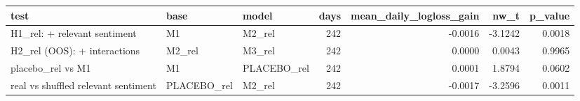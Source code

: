 \begin{tabular}{lllrrrr}
\toprule
test & base & model & days & mean\_daily\_logloss\_gain & nw\_t & p\_value \\
\midrule
H1\_rel: + relevant sentiment & M1 & M2\_rel & 242 & -0.0016 & -3.1242 & 0.0018 \\
H2\_rel (OOS): + interactions & M2\_rel & M3\_rel & 242 & 0.0000 & 0.0043 & 0.9965 \\
placebo\_rel vs M1 & M1 & PLACEBO\_rel & 242 & 0.0001 & 1.8794 & 0.0602 \\
real vs shuffled relevant sentiment & PLACEBO\_rel & M2\_rel & 242 & -0.0017 & -3.2596 & 0.0011 \\
\bottomrule
\end{tabular}
